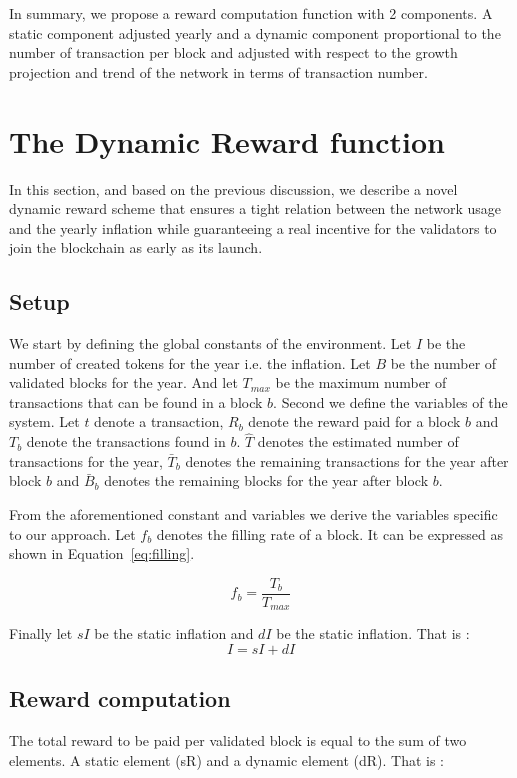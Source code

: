 \documentclass[]{article}
\begin{document}
In summary, we propose a reward computation function with 2 components. A static component adjusted yearly and a dynamic component proportional to the number of transaction per block and adjusted with respect to the growth projection and trend of the network in terms of transaction number.

\section{The Dynamic Reward function}
\label{sec:scheme}
In this section, and based on the previous discussion, we describe  a novel dynamic reward scheme that ensures a tight relation between the network usage and the yearly inflation while guaranteeing a real incentive for the validators to join the blockchain as early as its launch.

\subsection{Setup}
\label{setup}
We start by defining the global constants of the environment. Let  $I$ be the number of created tokens for the year i.e. the inflation. Let $B$ be the number of validated blocks for the year. And let $T_{max}$ be the maximum number of transactions that can be found in a block $b$. Second we define the variables of the system. Let $t$ denote a transaction, $R_b$ denote the reward paid for a block $b$ and $T_b$ denote the transactions found in $b$. $\hat{T}$ denotes the estimated number of transactions for the year, $\bar{T}_b$ denotes the remaining transactions for the year after block $b$ and $\bar{B}_b$ denotes the remaining blocks for the year after block $b$.


From the aforementioned constant and variables we derive the variables specific to our approach. Let $f_b$ denotes the filling rate of a block. It can be expressed as shown in Equation~\ref{eq:filling}.

\begin{equation}
        f_b=\frac{T_b}{T_{max}}
        \label{eq:filling}
\end{equation}

Finally let $sI$ be the static inflation and $dI$ be the static inflation. That is :
\begin{equation}
    I=sI+dI
    \label{eq:inflationsplit}
\end{equation}


\subsection{Reward computation}
The total reward to be paid per validated block is equal to the sum of two elements. A static element (sR) and a dynamic element (dR). That is :
\end{document}
